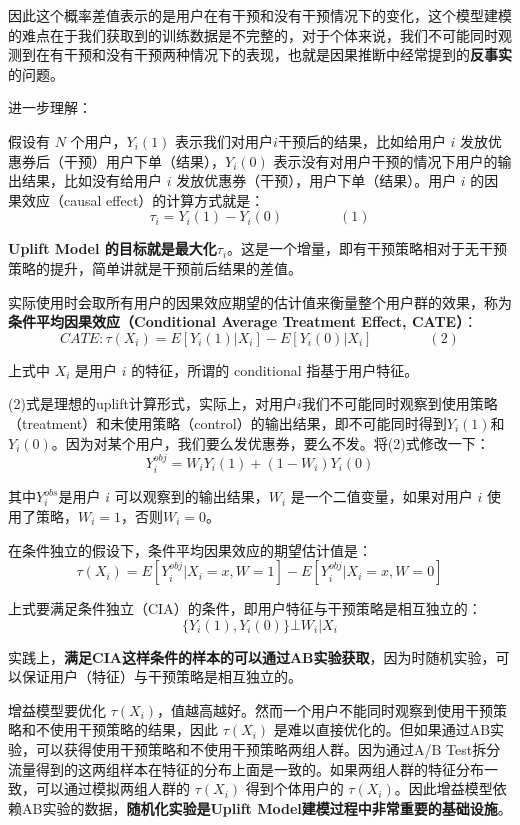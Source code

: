 \documentclass[12pt]{article}
\begin{document}
因此这个概率差值表示的是用户在有干预和没有干预情况下的变化，这个模型建模的难点在于我们获取到的训练数据是不完整的，对于个体来说，我们不可能同时观测到在有干预和没有干预两种情况下的表现，也就是因果推断中经常提到的\textbf{反事实}的问题。

\begin{framed}
进一步理解\cite{Uplift_Model_Principle_And_Practice}：

假设有 $N$ 个用户，$Y_i(1)$ 表示我们对用户$i$干预后的结果，比如给用户 $i$ 发放优惠券后（干预）用户下单（结果），$Y_i(0)$ 表示没有对用户干预的情况下用户的输出结果，比如没有给用户 $i$ 发放优惠券（干预），用户下单（结果）。用户 $i$ 的因果效应（causal effect）的计算方式就是：
$$
\tau_i = Y_i(1) - Y_i(0) \qquad \qquad (1) 
$$

\textbf{Uplift Model 的目标就是最大化$\tau_i$}。这是一个增量，即有干预策略相对于无干预策略的提升，简单讲就是干预前后结果的差值。

实际使用时会取所有用户的因果效应期望的估计值来衡量整个用户群的效果，称为\textbf{条件平均因果效应（Conditional Average Treatment Effect, CATE）}：
$$
CATE: \tau(X_i) = E[Y_i(1)|X_i] - E[Y_i(0)|X_i] \qquad \qquad (2)
$$

上式中 $X_i$ 是用户 $i$ 的特征，所谓的 conditional 指基于用户特征。

(2)式是理想的uplift计算形式，实际上，对用户$i$我们不可能同时观察到使用策略（treatment）和未使用策略（control）的输出结果，即不可能同时得到$Y_i(1)$和$Y_i(0)$。因为对某个用户，我们要么发优惠券，要么不发。将(2)式修改一下：
$$
Y_i^{obj} = W_iY_i(1) + (1-W_i)Y_i(0)
$$

其中$Y_i^{obs}​$是用户 $i$ 可以观察到的输出结果，$W_i$ 是一个二值变量，如果对用户 $i$ 使用了策略，$W_i = 1$，否则$W_i = 0$。

在条件独立的假设下，条件平均因果效应的期望估计值是：
$$
\tau(X_i) = E[Y_i^{obj}|X_i = x, W = 1] - E[Y_i^{obj}|X_i = x, W = 0] 
$$

上式要满足条件独立（CIA）的条件，即用户特征与干预策略是相互独立的：
$$
\{Y_i(1), Y_i(0)\} \bot W_i|X_i
$$

实践上，\textbf{满足CIA这样条件的样本的可以通过AB实验获取}，因为时随机实验，可以保证用户（特征）与干预策略是相互独立的。

增益模型要优化 $\tau(X_i)$，值越高越好。然而一个用户不能同时观察到使用干预策略和不使用干预策略的结果，因此 $\tau(X_i)$ 是难以直接优化的。但如果通过AB实验，可以获得使用干预策略和不使用干预策略两组人群。因为通过A/B Test拆分流量得到的这两组样本在特征的分布上面是一致的。如果两组人群的特征分布一致，可以通过模拟两组人群的 $\tau(X_i)$ 得到个体用户的 $\tau(X_i)$。因此增益模型依赖AB实验的数据，\textbf{随机化实验是Uplift Model建模过程中非常重要的基础设施}。
\end{framed}
\end{document}
